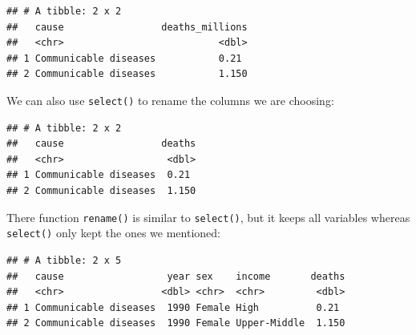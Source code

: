 \documentclass[
  12pt,
  krantz2]{krantz}
\makeatletter
\newenvironment{Shaded}{\begin{snugshade}}{\end{snugshade}}
\newcommand{\DataTypeTok}[1]{\textcolor[rgb]{0.13,0.29,0.53}{#1}}
\newcommand{\KeywordTok}[1]{\textcolor[rgb]{0.13,0.29,0.53}{\textbf{#1}}}
\newcommand{\NormalTok}[1]{#1}
\newcommand{\OperatorTok}[1]{\textcolor[rgb]{0.81,0.36,0.00}{\textbf{#1}}}
\newcommand{\StringTok}[1]{\textcolor[rgb]{0.31,0.60,0.02}{#1}}
\newenvironment{kframe}{%
\medskip{}
\setlength{\fboxsep}{.8em}
 \def\at@end@of@kframe{}%
 \ifinner\ifhmode%
  \def\at@end@of@kframe{\end{minipage}}%
  \begin{minipage}{\columnwidth}%
 \fi\fi%
 \def\FrameCommand##1{\hskip\@totalleftmargin \hskip-\fboxsep
 \colorbox{shadecolor}{##1}\hskip-\fboxsep
     \hskip-\linewidth \hskip-\@totalleftmargin \hskip\columnwidth}%
 \MakeFramed {\advance\hsize-\width
   \@totalleftmargin\z@ \linewidth\hsize
   \@setminipage}}%
 {\par\unskip\endMakeFramed%
 \at@end@of@kframe}
\renewenvironment{Shaded}{\begin{kframe}}{\end{kframe}}
\makeatother
\begin{document}
\begin{Shaded}
\end{Shaded}

\begin{verbatim}
## # A tibble: 2 x 2
##   cause                 deaths_millions
##   <chr>                           <dbl>
## 1 Communicable diseases           0.21 
## 2 Communicable diseases           1.150
\end{verbatim}

We can also use \texttt{select()} to rename the columns we are choosing:

\begin{Shaded}
\end{Shaded}

\begin{verbatim}
## # A tibble: 2 x 2
##   cause                 deaths
##   <chr>                  <dbl>
## 1 Communicable diseases  0.21 
## 2 Communicable diseases  1.150
\end{verbatim}

There function \texttt{rename()} is similar to \texttt{select()}, but it keeps all variables whereas \texttt{select()} only kept the ones we mentioned:

\begin{Shaded}
\end{Shaded}

\begin{verbatim}
## # A tibble: 2 x 5
##   cause                  year sex    income       deaths
##   <chr>                 <dbl> <chr>  <chr>         <dbl>
## 1 Communicable diseases  1990 Female High          0.21 
## 2 Communicable diseases  1990 Female Upper-Middle  1.150
\end{verbatim}
\end{document}
